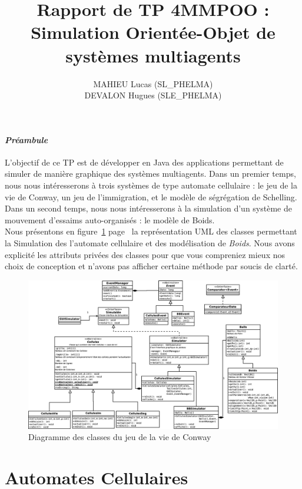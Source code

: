 \documentclass[a4paper, 10pt, french]{article}
\title{Rapport de TP 4MMPOO : Simulation Orientée-Objet de systèmes multiagents }
\author{
MAHIEU Lucas (SL\_PHELMA) 
\\ DEVALON Hugues (SLE\_PHELMA) 
}
\begin{document}
\maketitle

\paragraph{\em Préambule}
{L’objectif de ce TP est de développer en Java des applications permettant de simuler de manière graphique des systèmes multiagents. Dans un premier temps, nous nous intéresserons à trois systèmes de type automate cellulaire : le jeu de la vie de Conway, un jeu de l’immigration, et le modèle de ségrégation de Schelling. Dans un second temps, nous nous intéresserons à la simulation d’un système de mouvement d’essaims auto-organisés : le modèle de Boids.
\\Nous présentons en figure~\ref{étiquette} page~\pageref{étiquette} la représentation UML des classes permettant la Simulation des l'automate cellulaire et des modélisation de {\em Boids}. Nous avons explicité les attributs privées des classes pour que vous compreniez mieux nos choix de conception et n'avons pas afficher certaine méthode par soucis de clarté.
}
\begin{figure}[h]
\hspace{-20mm} 
	\includegraphics[scale=0.27]{UML_Cellules.eps}
	\caption{\label{étiquette} Diagramme des classes du jeu de la vie de Conway}
\end{figure}
\section{Automates Cellulaires}
\end{document}
